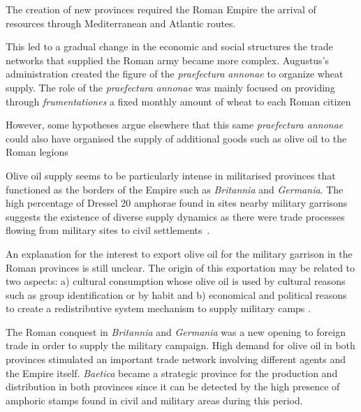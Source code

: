 \documentclass[review]{elsarticle}
\newcommand{\memo}[2]{\textcolor{#1}{#2}}
\newcommand{\xavi}[1]{\memo{magenta}{XRC: #1\\}}
\begin{document}
The creation of new provinces required the Roman Empire the arrival of resources through Mediterranean and Atlantic routes.

This led to a gradual change in the economic and social structures the trade networks that supplied the Roman army became more complex. Augustus's administration created the figure of the \textit{praefectura annonae} to organize wheat supply. The role of the \textit{praefectura annonae} was mainly focused on providing through \textit{frumentationes} a fixed monthly amount of wheat to each Roman citizen~\citep{remesal_annona_1986,remesal_concierto}

However, some hypotheses argue elsewhere that this same \textit{praefectura annonae} could also have organised the supply of additional goods such as olive oil to the Roman legions  \citep{remesal_annona_1986,
remesal_annona_1990}


 

Olive oil supply seems to be particularly intense in militarised provinces that functioned as the borders of the Empire such as \textit{Britannia} and \textit{Germania}. The high percentage of Dressel 20 amphorae found in sites nearby military garrisons suggests the existence of diverse supply dynamics as there were trade processes flowing from military sites to civil settlements~\citep{remesal_annona_1986, carreras_britannia_1998}.

An explanation for the interest to export olive oil for the military garrison in the Roman provinces is still unclear. The origin of this exportation may be related to two aspects: a) cultural consumption whose olive oil is used by cultural reasons such as group identification or by habit and b) economical and political reasons to create a redistributive system mechanism to supply military camps \citep[69-70]{carreras_britannia_1998}. 

The Roman conquest in \textit{Britannia} and \textit{Germania} was a new opening to foreign trade in order to supply the military campaign. High demand for olive oil in both provinces stimulated an important trade network involving different agents and the Empire itself. \textit{Baetica} became a strategic province for the production and distribution in both provinces since it can be detected by the high presence of amphoric stamps found in civil and military areas during this period. 
\end{document}
